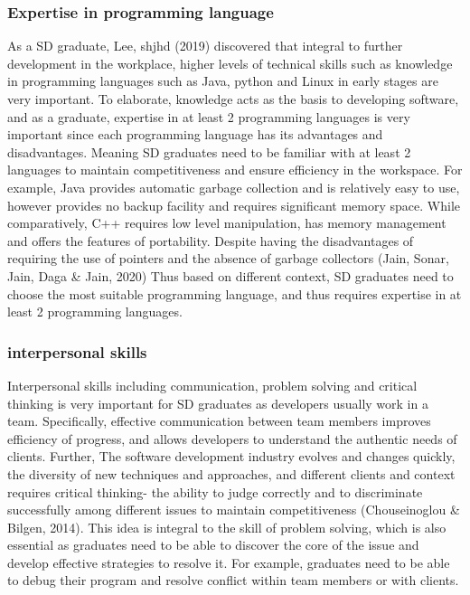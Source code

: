 \documentclass[a4paper, 11pt]{report}
\begin{document}
\subsubsection{Expertise in programming language}
As a SD graduate, Lee, shjhd (2019) discovered that integral to further development in the workplace, higher levels of technical skills such as knowledge in programming languages such as Java, python and Linux in early stages are very important. To elaborate, knowledge acts as the basis to developing software, and as a graduate, expertise in at least 2 programming languages is very important since each programming language has its advantages and disadvantages. Meaning SD graduates need to be familiar with at least 2 languages to maintain competitiveness and ensure efficiency in the workspace. For example, Java provides automatic garbage collection and is relatively easy to use, however provides no backup facility and requires significant memory space. While comparatively, C++ requires low level manipulation, has memory management and offers the features of portability. Despite having the disadvantages of requiring the use of pointers and the absence of garbage collectors (Jain, Sonar, Jain, Daga & Jain, 2020) Thus based on different context, SD graduates need to choose the most suitable programming language, and thus requires expertise in at least 2 programming languages.

\subsubsection{interpersonal skills}
Interpersonal skills including communication, problem solving and critical thinking is very important for SD graduates as developers usually work in a team. Specifically, effective communication between team members improves efficiency of progress, and allows developers to understand the authentic needs of clients. Further, The software development industry evolves and changes quickly, the diversity of new techniques and approaches, and different clients and context requires critical thinking- the ability to judge correctly and to discriminate successfully among different issues to maintain competitiveness (Chouseinoglou & Bilgen, 2014). This idea is integral to the skill of problem solving, which is also essential as graduates need to be able to discover the core of the issue and develop effective strategies to resolve it. For example, graduates need to be able to debug their program and resolve conflict within team members or with clients. 
\end{document}
